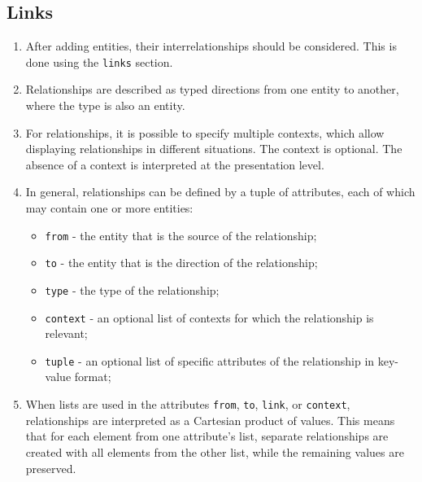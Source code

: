 \documentclass[final]{article}
\begin{document}
    \subsection{Links}
        \begin{enumerate}

            \item After adding entities, their interrelationships should be considered.
            This is done using the \texttt{links} section.

            \item Relationships are described as typed directions from one entity
            to another, where the type is also an entity.

            \item For relationships, it is possible to specify multiple contexts,
            which allow displaying relationships in different situations. The context is optional.
            The absence of a context is interpreted at the presentation level.

            \item In general, relationships can be defined by a tuple of attributes,
            each of which may contain one or more entities:

            \begin{itemize}
                \item \texttt{from} - the entity that is the source of the relationship;
                \item \texttt{to} - the entity that is the direction of the relationship;
                \item \texttt{type} - the type of the relationship;
                \item \texttt{context} - an optional list of contexts for which the relationship is relevant;
                \item \texttt{tuple} - an optional list of specific attributes of the relationship in key-value format;
            \end{itemize}

            \item When lists are used in the attributes \texttt{from}, \texttt{to}, \texttt{link}, or
            \texttt{context}, relationships are interpreted as a Cartesian product of values.
            This means that for each element from one attribute's list,
            separate relationships are created with all elements from the other list, 
            while the remaining values are preserved.


\end{enumerate}
\end{document}
